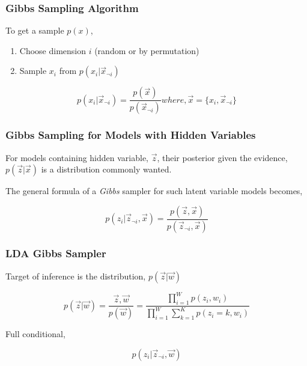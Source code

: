 \subsubsection*{Gibbs Sampling Algorithm}

To get a sample \(p(x)\),

\begin{enumerate}
 \item Choose dimension \(i\) (random or by permutation)
 \item Sample \(x_i\) from \(p(x_i|\vec{x}_{\neg i})\)
\end{enumerate}

\begin{equation}
 p(x_i|\vec{x}_{\neg i}) = \frac{p(\vec{x})}{p(\vec{x}_{\neg i})} where, \vec{x} = \{x_i,\vec{x}_{\neg i}\}
\end{equation}

\subsubsection*{Gibbs Sampling for Models with Hidden Variables}

For models containing hidden variable, \(\vec{z}\), their posterior given the evidence, \(p(\vec{z}|\vec{x})\) is a distribution commonly
wanted. 

The general formula of a \textit{Gibbs} sampler for such latent variable models becomes, 

\begin{equation}
 p(z_i|\vec{z}_{\neg i},\vec{x}) = \frac{p(\vec{z},\vec{x})}{p(\vec{z}_{\neg i},\vec{x})}
\end{equation}

\subsubsection*{LDA Gibbs Sampler}

Target of inference is the distribution, \(p(\vec{z}|\vec{w})\)

\begin{equation}
 p(\vec{z}|\vec{w}) = \frac{\vec{z},\vec{w}}{p(\vec{w})} = \frac{\prod_{i=1}^{W} p(z_i,w_i)}{\prod_{i=1}^{W} \sum_{k=1}^{K} p(z_i=k,w_i)}
\end{equation}

Full conditional, 

\begin{equation}\label{eqn:fullconditionalincomplete}
p(z_i|\vec{z}_{\neg i},\vec{w}) 
\end{equation}

